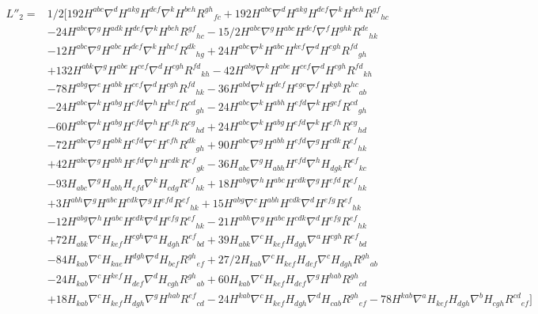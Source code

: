 \documentclass[a4paper,11pt]{article}
\begin{document}
\begin{align}
L''_2=
&
1/2[
192H^{abc}\nabla^dH^{akg}H^{def}\nabla^kH^{beh}R^{gh}{}_{fc}
+192H^{abc}\nabla^dH^{akg}H^{def}\nabla^kH^{beh}R^{gf}{}_{hc}
\\&
-24H^{abc}\nabla^gH^{adk}H^{def}\nabla^kH^{beh}R^{gf}{}_{hc}
-15/2H^{abc}\nabla^gH^{abc}H^{def}\nabla^fH^{ghk}R^{de}{}_{hk}
\\&
-12H^{abc}\nabla^gH^{abc}H^{def}\nabla^kH^{hef}R^{dk}{}_{hg}
+24H^{abc}\nabla^kH^{abc}H^{kef}\nabla^dH^{egh}R^{fd}{}_{gh}
\\&
+132H^{abk}\nabla^gH^{abe}H^{cef}\nabla^dH^{cgh}R^{fd}{}_{kh}
-42H^{abg}\nabla^kH^{abe}H^{cef}\nabla^dH^{cgh}R^{fd}{}_{kh}
\\&
-78H^{abg}\nabla^eH^{abk}H^{cef}\nabla^dH^{cgh}R^{fd}{}_{hk}
-36H^{abd}\nabla^kH^{def}H^{egc}\nabla^fH^{kgh}R^{hc}{}_{ab}
\\&
-24H^{abc}\nabla^kH^{abg}H^{efd}\nabla^hH^{kef}R^{cd}{}_{gh}
-24H^{abc}\nabla^kH^{abh}H^{efd}\nabla^kH^{gef}R^{cd}{}_{gh}
\\&
-60H^{abc}\nabla^kH^{abg}H^{efd}\nabla^hH^{efk}R^{cg}{}_{hd}
+24H^{abc}\nabla^kH^{abg}H^{efd}\nabla^kH^{efh}R^{cg}{}_{hd}
\\&
-72H^{abc}\nabla^gH^{abk}H^{efd}\nabla^cH^{efh}R^{dk}{}_{gh}
+90H^{abc}\nabla^gH^{abh}H^{efd}\nabla^gH^{cdk}R^{ef}{}_{hk}
\\&
+42H^{abc}\nabla^gH^{abh}H^{efd}\nabla^hH^{cdk}R^{ef}{}_{gk}
-36H_{abc}\nabla^gH_{abh}H^{efd}\nabla^hH_{dgk}R^{ef}{}_{kc}
\\&
-93H_{abc}\nabla^gH_{abh}H_{efd}\nabla^kH_{cdg}R^{ef}{}_{hk}
+18H^{abg}\nabla^hH^{abc}H^{cdk}\nabla^gH^{efd}R^{ef}{}_{hk}
\\&
+3H^{abh}\nabla^gH^{abc}H^{cdk}\nabla^gH^{efd}R^{ef}{}_{hk}
+15H^{abg}\nabla^cH^{abh}H^{cdk}\nabla^dH^{efg}R^{ef}{}_{hk}
\\&
-12H^{abg}\nabla^hH^{abc}H^{cdk}\nabla^dH^{efg}R^{ef}{}_{hk}
-21H^{abh}\nabla^gH^{abc}H^{cdk}\nabla^dH^{efg}R^{ef}{}_{hk}
\\&
+72H_{abk}\nabla^cH_{kef}H^{cgh}\nabla^aH_{dgh}R^{ef}{}_{bd}
+39H_{abk}\nabla^cH_{kef}H_{dgh}\nabla^aH^{cgh}R^{ef}{}_{bd}
\\&
-84H_{kab}\nabla^cH_{kae}H^{dgh}\nabla^dH_{bcf}R^{gh}{}_{ef}
+27/2H_{kab}\nabla^cH_{kef}H_{def}\nabla^cH_{dgh}R^{gh}{}_{ab}
\\&
-24H_{kab}\nabla^cH^{kef}H_{def}\nabla^dH_{cgh}R^{gh}{}_{ab}
+60H_{kab}\nabla^cH_{kef}H_{def}\nabla^gH^{hab}R^{gh}{}_{cd}
\\&
+18H_{kab}\nabla^cH_{kef}H_{dgh}\nabla^gH^{hab}R^{ef}{}_{cd}
-24H^{kab}\nabla^cH_{kef}H_{dgh}\nabla^dH_{cab}R^{gh}{}_{ef}
-78H^{kab}\nabla^aH_{kef}H_{dgh}\nabla^bH_{cgh}R^{cd}{}_{ef}
]
\end{align}
\end{document}
